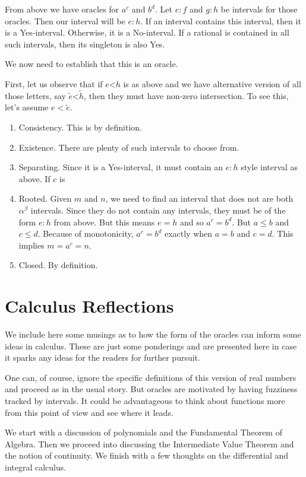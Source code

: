 \documentclass[12pt]{article}
\theoremstyle{remark}
\newcommand{\lt}{\mathord{<}}
\begin{document}
From above we have oracles for $a^c$ and $b^d$. Let $e:f$ and $g:h$ be intervals for those oracles. Then our interval will be $e:h$. If an interval contains this interval, then it is a Yes-interval. Otherwise, it is a No-interval. If a rational is contained in all such intervals, then its singleton is also Yes. 

We now need to establish that this is an oracle. 

First, let us observe that if $e \lt h$ is as above and we have alternative version of all those letters, say $\tilde{e} \lt \tilde{h}$, then they must have non-zero intersection. To see this, let's assume $ e < \tilde{e}$. 

\begin{enumerate}
    \item Consistency. This is by definition. 
    \item Existence. There are plenty of such intervals to choose from.
    \item Separating. Since it is a Yes-interval, it must contain an $e:h$ style interval as above. If $c$ is 
    \item Rooted. Given $m$ and $n$, we need to find an interval that does not  are both $\alpha^\beta$ intervals. Since they do not contain any intervals, they must be of the form $e:h$ from above. But this means $e=h$ and so $a^c = b^d$. But $a \leq b$ and $c \leq d$. Because of monotonicity, $a^c = b^d$ exactly when $a=b$ and $c=d$. This implies $m = a^c = n$.
    \item Closed. By definition. 
\end{enumerate}




\section{Calculus Reflections}\label{app:calc}

We include here some musings as to how the form of the oracles can inform some ideas in calculus. These are just some ponderings and are presented here in case it sparks any ideas for the readers for further pursuit. 

One can, of course, ignore the specific definitions of this version of real numbers and proceed as in the usual story. But oracles are motivated by having fuzziness tracked by intervals. It could be advantageous to think about functions more from this point of view and see where it leads. 

We start with a discussion of polynomials and the Fundamental Theorem of Algebra. Then we proceed into discussing the Intermediate Value Theorem and the notion of continuity. We finish with a few thoughts on the differential and integral calculus. 
\end{document}
